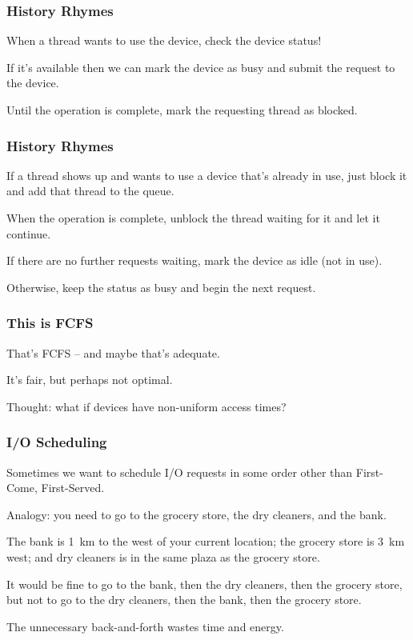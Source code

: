 \begin{frame}
\frametitle{History Rhymes}

When a thread wants to use the device, check the device status! 

If it's available then we can mark the device as busy and submit the request to the device. 

Until the operation is complete, mark the requesting thread as blocked. 

\end{frame}


\begin{frame}
\frametitle{History Rhymes}

If a thread shows up and wants to use a device that's already in use, just block it and add that thread to the queue. 

When the operation is complete, unblock the thread waiting for it and let it continue. 

If there are no further requests waiting, mark the device as idle (not in use). 

Otherwise, keep the status as busy and begin the next request.

\end{frame}


\begin{frame}
\frametitle{This is FCFS}

That's FCFS -- and maybe that's adequate.

It's fair, but perhaps not optimal.

Thought: what if devices have non-uniform access times?

\end{frame}

\begin{frame}
\frametitle{I/O Scheduling}

Sometimes we want to schedule I/O requests in some order other than First-Come, First-Served. 

Analogy: you need to go to the grocery store, the dry cleaners, and the bank. 

The bank is 1~km to the west of your current location; the grocery store is 3~km west; and dry cleaners is in the same plaza as the grocery store. 

It would be fine to go to the bank, then the dry cleaners, then the grocery store, but not to go to the dry cleaners, then the bank, then the grocery store. 

The unnecessary back-and-forth wastes time and energy.


\end{frame}

